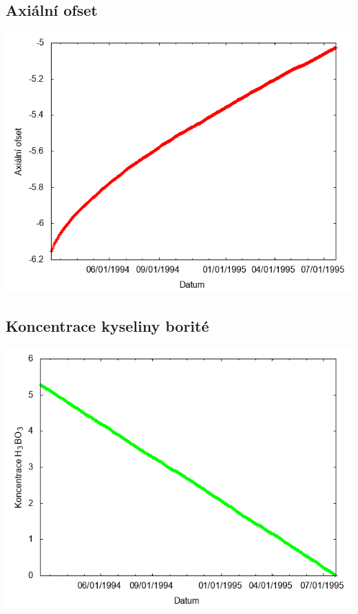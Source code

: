 \documentclass[a4paper,twoside,11pt]{article}
\begin{document}
\subsection*{Axiální ofset}
\begin{center}
\includegraphics[width=.8\textwidth]{graphs/Atlantis_11_ao.png}
\end{center}

\subsection*{Koncentrace kyseliny borité}
\begin{center}
\includegraphics[width=.8\textwidth]{graphs/Atlantis_11_bc.png}
\end{center}
\end{document}
